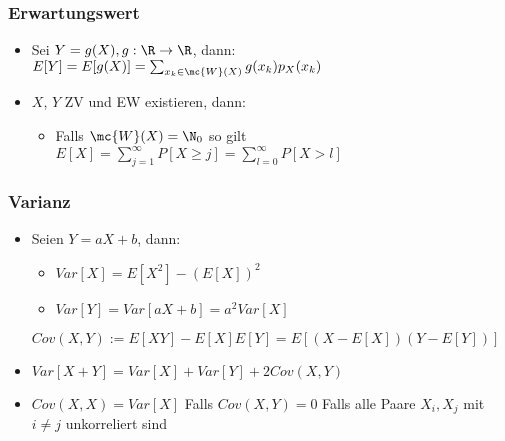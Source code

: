 \subsubsection{Erwartungswert}
\begin{itemize}
     $E[X] := \sum_{x_k \in \mc{W}(X)} x_k p_X(x_k)$
        \begin{itemize}
            \item Definiert falls $\sum_{x_k \in \mc{W}(X)} |x_k| p_X(x_k) < \infty$
        \end{itemize}
    \item Sei $Y = g(X), g: \R \to \R$, dann: $E[Y] = E[g(X)] = \sum_{x_k \in \mc{W}(X)} g(x_k) p_X(x_k)$
    \item $X$, $Y$ ZV und EW existieren, dann:
        \begin{itemize}
             $\forall \omega \ X(\omega) \le Y(\omega) \implies E[X] \le E[Y]$
             Für bel. $a,b \in \R$ gilt $E[aX + b] = a E[X] + b$
            \item Falls $\mc{W}(X) = \N_0$ so gilt $E[X] = \sum_{j=1}^{\infty} P[X \ge j] = \sum_{l=0}^{\infty} P[X > l]$
        \end{itemize}
\end{itemize}

\subsubsection{Varianz}
\begin{itemize}
     $Var[X] := E[(X - E[X])^2]$
        \begin{itemize}
            \item Definiert falls $E[X^2] < \infty$
             $\sigma(X) := \sqrt{Var[X]}$
            \item $Var[X] = \sum_{x_k \in \mc{W}(X)} (x_k - E[X])^2 p_X(x_k)$
        \end{itemize}
    \item Seien $Y = aX + b$, dann:
        \begin{itemize}
            \item $Var[X] = E[X^2] - (E[X])^2$
            \item $Var[Y] = Var[aX + b] = a^2 Var[X]$
        \end{itemize}
     $Cov(X,Y) := E[XY] - E[X] E[Y] = E[(X - E[X])(Y - E[Y])]$
    \item $Var[X + Y] = Var[X] + Var[Y] + 2 Cov(X, Y)$
    \item $Cov(X, X) = Var[X]$
     Falls $Cov(X, Y) = 0$
     Falls alle Paare $X_i, X_j$ mit $i \neq j$ unkorreliert sind
\end{itemize}

